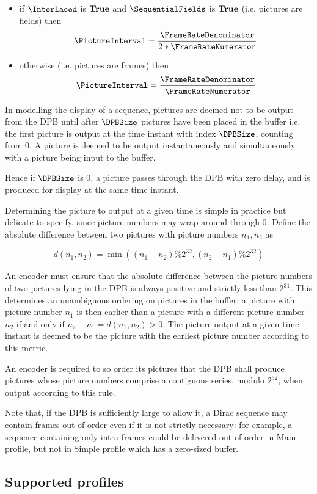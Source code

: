 \begin{itemize}
\item if $\Interlaced$ is $\text{\bf{True}}$ and $\SequentialFields$ is $\text{\bf{True}}$ (i.e. pictures are fields) then 
\begin{equation*}
\PictureInterval=\dfrac{\FrameRateDenominator}{2*\FrameRateNumerator}
\end{equation*}
\item otherwise (i.e. pictures are frames) then 
\begin{equation*}
\PictureInterval=\dfrac{\FrameRateDenominator}{\FrameRateNumerator}
\end{equation*}
\end{itemize}

In modelling the display of a sequence, pictures are deemed not to be output from the DPB until after $\DPBSize$ pictures
have been placed in the buffer i.e. the first picture is output at the time instant with index $\DPBSize$, counting from 0. 
A picture is deemed to be output instantaneously and simultaneously with a picture being input to the buffer.

Hence if $\DPBSize$ is 0, a picture passes through the DPB with zero delay, and is produced for display at the same
time instant. 

Determining the picture to output at a given time is simple in practice but delicate to specify, since picture numbers
may wrap around through 0. Define the absolute difference between two pictures with picture numbers $n_1, n_2$
as

\[d(n_1,n_2)=\min\left((n_1-n_2) \% 2^{32}, (n_2-n_1) \% 2^{32} \right)\] 

An encoder must ensure that the absolute difference between the picture numbers of two pictures lying in the DPB is 
always positive and strictly less than $2^{31}$. This determines an unambiguous ordering
on pictures in the buffer: a picture with picture number $n_1$ is then earlier than a picture with a different picture number 
$n_2$ if and only if $n_2-n_1=d(n_1,n_2)>0$. The picture output at a given time instant is deemed to be the picture 
with the earliest picture number according to this metric.

An encoder is required to so order its pictures that the DPB shall produce pictures whose picture numbers comprise a
contiguous series, modulo $2^{32}$, when output according to this rule.

\begin{informative}
Note that, if the DPB is sufficiently large to allow it, a Dirac sequence may contain frames out of order
even if it is not strictly necessary: for example, a sequence containing only intra frames could be 
delivered out of order in Main profile, but not in Simple profile which has a zero-sized buffer.
\end{informative}

\subsection{Supported profiles}